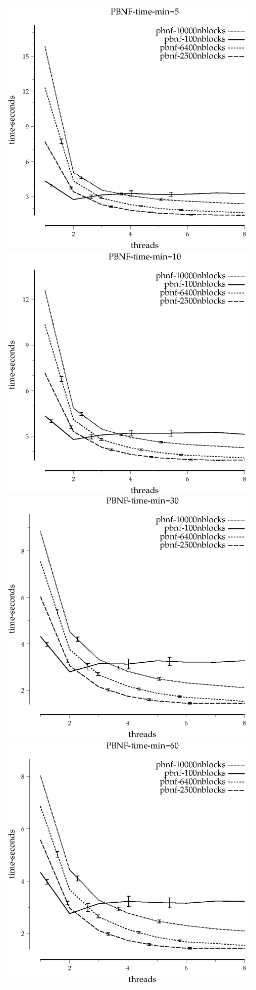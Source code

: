 \documentclass{article}
\begin{document}
\begin{figure}
\begin{center}
\includegraphics[width=2.5in]{PBNF-time-min=5}
\includegraphics[width=2.5in]{PBNF-time-min=10}
\includegraphics[width=2.5in]{PBNF-time-min=30}
\includegraphics[width=2.5in]{PBNF-time-min=60}

\end{center}
\end{figure}
\end{document}
